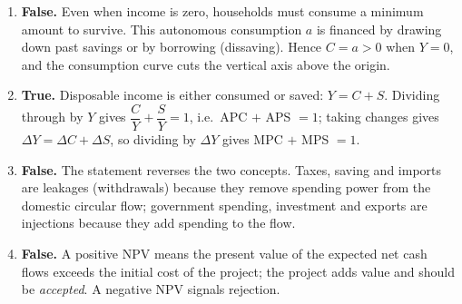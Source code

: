 \documentclass[11pt]{article}
\newcommand{\cle}[1]{{\popxbold\color{popdark}#1}}
\begin{document}
\begin{corrige}
\begin{enumerate}
\item \textbf{False.} Even when income is zero, households must consume a minimum amount to survive. This \cle{autonomous consumption} $a$ is financed by drawing down past savings or by borrowing (dissaving). Hence $C = a > 0$ when $Y = 0$, and the consumption curve cuts the vertical axis above the origin.
\item \textbf{True.} Disposable income is either consumed or saved: $Y = C + S$. Dividing through by $Y$ gives $\dfrac{C}{Y} + \dfrac{S}{Y} = 1$, i.e.\ APC $+$ APS $= 1$; taking changes gives $\Delta Y = \Delta C + \Delta S$, so dividing by $\Delta Y$ gives MPC $+$ MPS $= 1$.
\item \textbf{False.} The statement reverses the two concepts. Taxes, saving and imports are \cle{leakages} (withdrawals) because they remove spending power from the domestic circular flow; government spending, investment and exports are \cle{injections} because they add spending to the flow.
\item \textbf{False.} A positive NPV means the present value of the expected net cash flows exceeds the initial cost of the project; the project adds value and should be \emph{accepted}. A negative NPV signals rejection.
\end{enumerate}
\end{corrige}
\end{document}
